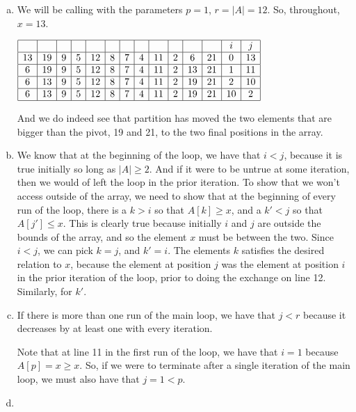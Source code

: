 \documentclass{article}
\begin{document}
\begin{enumerate}[a.]
\item
We will be calling with the parameters $p=1$, $r=|A|=12$. So, throughout, $x=13$.
 
$
\begin{array}{|c|c|c|c|c|c|c|c|c|c|c|c|c|c|c|}
\hline
&&&&&&&&&&&&i&j\\
\hline
13&19&9&5&12&8&7&4&11&2&6&21&0&13\\
\hline
6&19&9&5&12&8&7&4&11&2&13&21&1&11\\
\hline
6&13&9&5&12&8&7&4&11&2&19&21&2&10\\
\hline
6&13&9&5&12&8&7&4&11&2&19&21&10&2\\
\hline
\end{array}
$

And we do indeed see that partition has moved the two elements that are bigger than the pivot, 19 and 21, to the two final positions in the array.

\item
We know that at the beginning of the loop, we have that $i<j$, because it is true initially so long as $|A|\ge 2$. And if it were to be untrue at some iteration, then we would of left the loop in the prior iteration. To show that we won't access outside of the array, we need to show that at the beginning of every run of the loop, there is a $k>i$ so that $A[k]\ge x$, and a $k'<j$ so that $A[j']\le x$. This is clearly true because initially $i$ and $j$ are outside the bounds of the array, and so the element $x$ must be between the two. Since $i<j$, we can pick $k=j$, and $k' =i$. The elements $k$ satisfies the desired relation to $x$, because the element at position $j$ was the element at position $i$ in the prior iteration of the loop, prior to doing the exchange on line 12. Similarly, for $k'$.

\item

If there is more than one run of the main loop, we have that $j<r$ because it decreases by at least one with every iteration.

Note that at line 11 in the first run of the loop, we have that $i=1$ because $A[p] =x \ge x$. So, if we were to terminate after a single iteration of the main loop, we must also have that $j=1 <p$.

\item


\end{enumerate}
\end{document}
